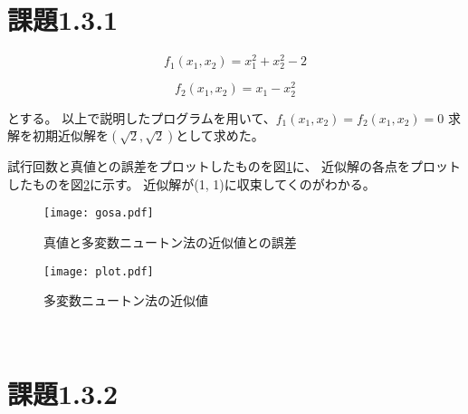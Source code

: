 \documentclass[uplatex, 11pt,a4j, titlepage]{jsarticle}
\begin{document}
\section{課題1.3.1}

\begin{equation}
    f_1(x_1, x_2) = x_1^2 + x_2^2 - 2
\end{equation}

\begin{equation}
    f_2(x_1, x_2) = x_1 - x_2^2
\end{equation}

とする。
以上で説明したプログラムを用いて、$f_1(x_1, x_2) = f_2(x_1, x_2) = 0$
求解を初期近似解を$(\sqrt{2},\sqrt{2})$として求めた。

試行回数と真値との誤差をプロットしたものを図\ref{gosa}に、
近似解の各点をプロットしたものを図\ref{plot}に示す。
近似解が(1, 1)に収束してくのがわかる。

\begin{figure}[h]
    \centering
    \texttt{[image: gosa.pdf]}
    \caption{真値と多変数ニュートン法の近似値との誤差}
    \label{gosa}
\end{figure}

\begin{figure}[h]
    \centering
    \texttt{[image: plot.pdf]}
    \caption{多変数ニュートン法の近似値}
    \label{plot}
\end{figure}

\newpage
\newpage
\ 
\newpage

\section{課題1.3.2}

\newpage

\newpage
\thispagestyle{empty}
\nocite{key1}
\nocite{key2}


\end{document}

